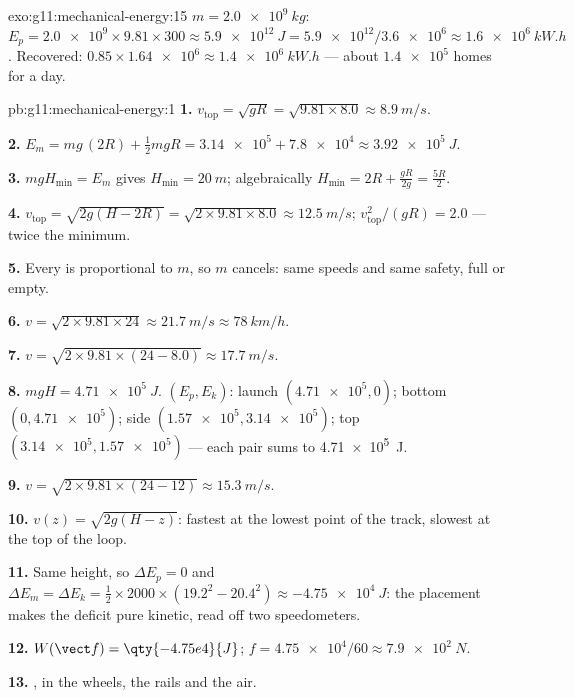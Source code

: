 \begin{solution}{exo:g11:mechanical-energy:15}
$m = \qty{2.0e9}{kg}$:
$E_p = \num{2.0e9} \times 9.81 \times 300 \approx \qty{5.9e12}{J}
= \num{5.9e12}/\num{3.6e6} \approx \qty{1.6e6}{kW.h}$. Recovered:
$0.85 \times \num{1.64e6} \approx \qty{1.4e6}{kW.h}$ --- about
$\num{1.4e5}$ homes for a day.
\end{solution}

\begin{solution}{pb:g11:mechanical-energy:1}
\textbf{1.} $v_{\text{top}} = \sqrt{gR} = \sqrt{9.81 \times 8.0}
\approx \qty{8.9}{m/s}$.

\textbf{2.} $E_m = mg\,(2R) + \tfrac12 m gR = \num{3.14e5} +
\num{7.8e4} \approx \qty{3.92e5}{J}$.

\textbf{3.} $mgH_{\min} = E_m$ gives $H_{\min} = \qty{20}{m}$;
algebraically $H_{\min} = 2R + \frac{gR}{2g} = \frac{5R}{2}$.

\textbf{4.} $v_{\text{top}} = \sqrt{2g(H - 2R)} =
\sqrt{2 \times 9.81 \times 8.0} \approx \qty{12.5}{m/s}$;
$v_{\text{top}}^2/(gR) = 2.0$ --- twice the minimum.

\textbf{5.} Every  is proportional to $m$, so $m$ cancels: same
speeds and same safety, full or empty.

\textbf{6.} $v = \sqrt{2 \times 9.81 \times 24} \approx \qty{21.7}{m/s}
\approx \qty{78}{km/h}$.

\textbf{7.} $v = \sqrt{2 \times 9.81 \times (24 - 8.0)} \approx
\qty{17.7}{m/s}$.

\textbf{8.} $mgH = \qty{4.71e5}{J}$. $(E_p, E_k)$: launch
$(\num{4.71e5}, 0)$; bottom $(0, \num{4.71e5})$; side
$(\num{1.57e5}, \num{3.14e5})$; top $(\num{3.14e5}, \num{1.57e5})$ ---
each pair sums to \qty{4.71e5}{J}.

\textbf{9.} $v = \sqrt{2 \times 9.81 \times (24 - 12)} \approx
\qty{15.3}{m/s}$.

\textbf{10.} $v(z) = \sqrt{2g(H - z)}$: fastest at the lowest point of
the track, slowest at the top of the loop.

\textbf{11.} Same height, so $\Delta E_p = 0$ and
$\Delta E_m = \Delta E_k = \tfrac12 \times 2000 \times (19.2^2 -
20.4^2) \approx \qty{-4.75e4}{J}$: the placement makes the deficit pure
kinetic, read off two speedometers.

\textbf{12.} $W(\vect f) = \qty{-4.75e4}{J}$;
$f = \num{4.75e4}/60 \approx \qty{7.9e2}{N}$.

\textbf{13.} , in the wheels, the rails and the air.


\end{solution}
